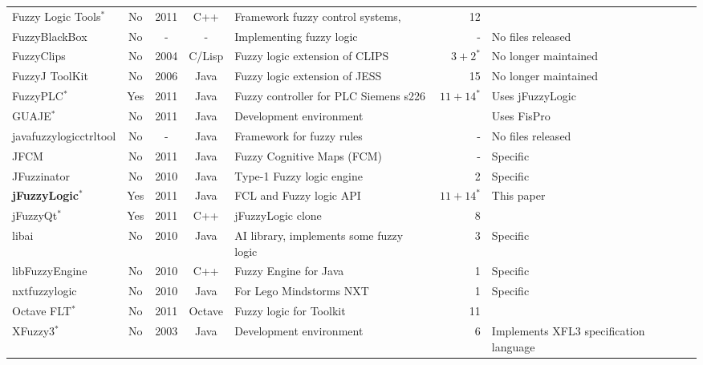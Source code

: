 \documentclass[conference]{IEEEtran}
\begin{document}
\begin{table}[!t]
\begin{tabular}{|l|c|c|c|l|r|l|}
		Fuzzy Logic Tools$^{\ast}$
			& No
			& 2011
			& C++
			& Framework fuzzy control systems,
			& 12
			& 
			\\

		FuzzyBlackBox
			& No
			& -
			& -
			& Implementing fuzzy logic
			& -
			& No files released
			\\
			
		FuzzyClips			
			& No	
			& 2004
			& C/Lisp
			& Fuzzy logic extension of CLIPS
			& $3 + 2^*$
			& No longer maintained
			\\

		FuzzyJ ToolKit		
			& No	
			& 2006 
			& Java
			& Fuzzy logic extension of JESS
			& 15
			& No longer maintained
			\\

		FuzzyPLC$^{\ast}$
			& Yes
			& 2011
			& Java
			& Fuzzy controller for PLC Siemens s226
			& $11 + 14^*$
			& Uses jFuzzyLogic
			\\
			
		GUAJE$^{\ast}$ 				
			& No
			& 2011
			& Java
			& Development environment 
			& 
			& Uses FisPro
			\\
                             
		javafuzzylogicctrltool
			& No
			& -
			& Java
			& Framework for fuzzy rules
			& -
			& No files released
			\\
			
		JFCM
			& No
			& 2011
			& Java
			& Fuzzy Cognitive Maps (FCM)
			& -
			& Specific
			\\

		JFuzzinator
			& No
			& 2010
			& Java
			& Type-1 Fuzzy logic engine
			& 2
			& Specific
			\\
						
		\textbf{jFuzzyLogic}$^{\ast}$
			& Yes	
			& 2011 
			& Java
			& FCL and Fuzzy logic API
			& $11 + 14^*$
			& This paper 
			\\

		jFuzzyQt$^{\ast}$			
			& Yes	
			& 2011 
			& C++
			& jFuzzyLogic clone 
			& 8
			& 
			\\
			
		libai			
			& No	
			& 2010 
			& Java 
			& AI library, implements some fuzzy logic 
			& 3
			& Specific
			\\
			
		libFuzzyEngine
			& No
			& 2010
			& C++
			& Fuzzy Engine for Java
			& 1
			& Specific
			\\
			
		nxtfuzzylogic
			& No
			& 2010
			& Java
			& For Lego Mindstorms NXT
			& 1
			& Specific
			\\
			
		Octave FLT$^{\ast}$
			& No
			& 2011
			& Octave
			& Fuzzy logic for Toolkit
			& 11
			& 
			\\

		XFuzzy3$^{\ast}$
			& No
			& 2003
			& Java
			& Development environment
			& 6
			& Implements XFL3 specification language
			\\
			
		\hline
	\end{tabular}
\end{table}
\end{document}
